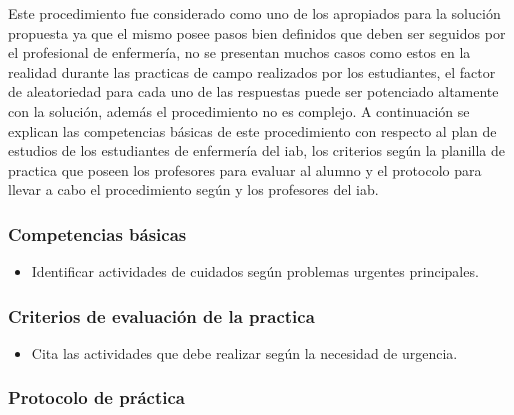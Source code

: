 Este procedimiento fue considerado como uno de los apropiados para la solución
propuesta ya que el mismo posee pasos bien definidos que deben ser seguidos por
el profesional de enfermería, no se presentan muchos casos como estos en la
realidad durante las practicas de campo realizados por los estudiantes, el
factor de aleatoriedad para cada uno de las respuestas puede ser potenciado
altamente con la solución, además el procedimiento no es complejo. A
continuación se explican las competencias básicas de este procedimiento con
respecto al plan de estudios de los estudiantes de enfermería del \Gls{iab}, los
criterios según la planilla de practica que poseen los profesores para evaluar
al alumno y el protocolo para llevar a cabo el procedimiento según
\cite{protocolo} y los profesores del \Gls{iab}.

\subsubsection{Competencias básicas}
\begin{itemize}
\item Identificar actividades de cuidados según problemas urgentes principales.
\end{itemize}

\subsubsection{Criterios de evaluación de la practica}
\begin{itemize}
\item Cita las actividades que debe realizar según la necesidad de urgencia.
\end{itemize}

\subsubsection{Protocolo de práctica}

